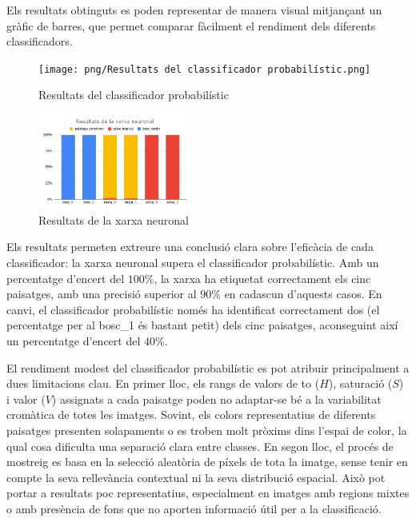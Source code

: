 \documentclass{ieeetj}
\begin{document}
Els resultats obtinguts es poden representar de manera visual mitjançant un gràfic de barres, que permet comparar fàcilment el rendiment dels diferents classificadors.
\begin{figure}[H]
    \centering
    \texttt{[image: png/Resultats del classificador probabilístic.png]}
    \caption{Resultats del classificador probabilístic}
    \label{fig:enter-label}
\end{figure}

\begin{figure}[H]
    \centering
    \includegraphics[width=0.45\textwidth]{png/Resultats de la xarxa neuronal.png}
    \caption{Resultats de la xarxa neuronal}
    \label{fig:enter-label}
\end{figure}

Els resultats permeten extreure una conclusió clara sobre l’eficàcia de cada classificador: la xarxa neuronal supera el classificador probabilístic. Amb un percentatge d'encert del \(100\%\), la xarxa ha etiquetat correctament els cinc paisatges, amb una precisió superior al \(90\%\) en cadascun d’aquests casos. En canvi, el classificador probabilístic només ha identificat correctament dos (el percentatge per al bosc\_1 és bastant petit)  dels cinc paisatges, aconseguint així un percentatge d’encert del \(40\%\).\newline

El rendiment modest del classificador probabilístic es pot atribuir principalment a dues limitacions clau. En primer lloc, els rangs de valors de to (\(H\)), saturació (\(S\)) i valor (\(V\)) assignats a cada paisatge poden no adaptar-se bé a la variabilitat cromàtica de totes les imatges. Sovint, els colors representatius de diferents paisatges presenten solapaments o es troben molt pròxims dins l'espai de color, la qual cosa dificulta una separació clara entre classes. \newline
En segon lloc, el procés de mostreig es basa en la selecció aleatòria de píxels de tota la imatge, sense tenir en compte la seva rellevància contextual ni la seva distribució espacial. Això pot portar a resultats poc representatius, especialment en imatges amb regions mixtes o amb presència de fons que no aporten informació útil per a la classificació.
\end{document}

